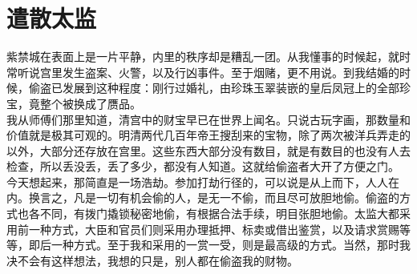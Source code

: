 \fancyhead[RO]{} %
\fancyhead[LE]{} %
\chapter*{遣散太监}
\thispagestyle{empty}
紫禁城在表面上是一片平静，内里的秩序却是糟乱一团。从我懂事的时候起，就时常听说宫里发生盗案、火警，以及行凶事件。至于烟赌，更不用说。到我结婚的时候，偷盗已发展到这种程度：刚行过婚礼，由珍珠玉翠装嵌的皇后凤冠上的全部珍宝，竟整个被换成了赝品。\\

我从师傅们那里知道，清宫中的财宝早已在世界上闻名。只说古玩字画，那数量和价值就是极其可观的。明清两代几百年帝王搜刮来的宝物，除了两次被洋兵弄走的以外，大部分还存放在宫里。这些东西大部分没有数目，就是有数目的也没有人去检查，所以丢没丢，丢了多少，都没有人知道。这就给偷盗者大开了方便之门。\\

今天想起来，那简直是一场浩劫。参加打劫行径的，可以说是从上而下，人人在内。换言之，凡是一切有机会偷的人，是无一不偷，而且尽可放胆地偷。偷盗的方式也各不同，有拨门撬锁秘密地偷，有根据合法手续，明目张胆地偷。太监大都采用前一种方式，大臣和官员们则采用办理抵押、标卖或借出鉴赏，以及请求赏赐等等，即后一种方式。至于我和采用的一赏一受，则是最高级的方式。当然，那时我决不会有这样想法，我想的只是，别人都在偷盗我的财物。\\

